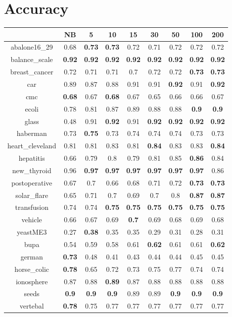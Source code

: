 \documentclass{article}%
\begin{document}
%
\normalsize%
\section*{Accuracy}%
\begin{tabular}{c|cccccccc}%
\hline%
&NB&5&10&15&30&50&100&200\\%
\hline%
abalone16\_29&0.68&\textbf{0.73}&\textbf{0.73}&0.72&0.71&0.72&0.72&0.72\\%
\hline%
balance\_scale&\textbf{0.92}&\textbf{0.92}&\textbf{0.92}&\textbf{0.92}&\textbf{0.92}&\textbf{0.92}&\textbf{0.92}&\textbf{0.92}\\%
\hline%
breast\_cancer&0.72&0.71&0.71&0.7&0.72&0.72&\textbf{0.73}&\textbf{0.73}\\%
\hline%
car&0.89&0.87&0.88&0.91&0.91&\textbf{0.92}&0.91&\textbf{0.92}\\%
\hline%
cmc&\textbf{0.68}&0.67&\textbf{0.68}&0.67&0.65&0.66&0.66&0.67\\%
\hline%
ecoli&0.78&0.81&0.87&0.89&0.88&0.88&\textbf{0.9}&\textbf{0.9}\\%
\hline%
glass&0.48&0.91&\textbf{0.92}&0.91&\textbf{0.92}&\textbf{0.92}&\textbf{0.92}&\textbf{0.92}\\%
\hline%
haberman&0.73&\textbf{0.75}&0.73&0.74&0.74&0.74&0.73&0.73\\%
\hline%
heart\_cleveland&0.81&0.81&0.83&0.81&\textbf{0.84}&0.83&0.83&\textbf{0.84}\\%
\hline%
hepatitis&0.66&0.79&0.8&0.79&0.81&0.85&\textbf{0.86}&0.84\\%
\hline%
new\_thyroid&0.96&\textbf{0.97}&\textbf{0.97}&\textbf{0.97}&\textbf{0.97}&\textbf{0.97}&\textbf{0.97}&0.86\\%
\hline%
postoperative&0.67&0.7&0.66&0.68&0.71&0.72&\textbf{0.73}&\textbf{0.73}\\%
\hline%
solar\_flare&0.65&0.71&0.7&0.69&0.7&0.8&\textbf{0.87}&\textbf{0.87}\\%
\hline%
transfusion&0.74&0.74&\textbf{0.75}&\textbf{0.75}&\textbf{0.75}&\textbf{0.75}&\textbf{0.75}&\textbf{0.75}\\%
\hline%
vehicle&0.66&0.67&0.69&\textbf{0.7}&0.69&0.68&0.69&0.68\\%
\hline%
yeastME3&0.27&\textbf{0.38}&0.35&0.35&0.29&0.31&0.28&0.31\\%
\hline%
bupa&0.54&0.59&0.58&0.61&\textbf{0.62}&0.61&0.61&\textbf{0.62}\\%
\hline%
german&\textbf{0.73}&0.48&0.41&0.43&0.44&0.44&0.45&0.45\\%
\hline%
horse\_colic&\textbf{0.78}&0.65&0.72&0.73&0.75&0.77&0.74&0.74\\%
\hline%
ionosphere&0.87&0.88&\textbf{0.89}&0.87&0.88&0.88&0.88&0.88\\%
\hline%
seeds&\textbf{0.9}&\textbf{0.9}&\textbf{0.9}&0.89&0.89&\textbf{0.9}&\textbf{0.9}&\textbf{0.9}\\%
\hline%
vertebal&\textbf{0.78}&0.75&0.77&0.77&0.77&0.77&0.77&0.77\\%
\hline%
\end{tabular}
\end{document}

